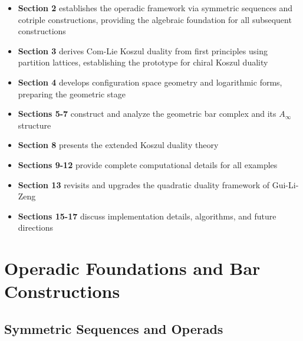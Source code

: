 \begin{itemize}
\item \textbf{Section 2} establishes the operadic framework via symmetric sequences and cotriple constructions, providing the algebraic foundation for all subsequent constructions
\item \textbf{Section 3} derives Com-Lie Koszul duality from first principles using partition lattices, establishing the prototype for chiral Koszul duality
\item \textbf{Section 4} develops configuration space geometry and logarithmic forms, preparing the geometric stage
\item \textbf{Sections 5-7} construct and analyze the geometric bar complex and its $A_\infty$ structure
\item \textbf{Section 8} presents the extended Koszul duality theory
\item \textbf{Sections 9-12} provide complete computational details for all examples
\item \textbf{Section 13} revisits and upgrades the quadratic duality framework of Gui-Li-Zeng
\item \textbf{Sections 15-17} discuss implementation details, algorithms, and future directions
\end{itemize}
 
\section{Operadic Foundations and Bar Constructions}
 
\subsection{Symmetric Sequences and Operads}

